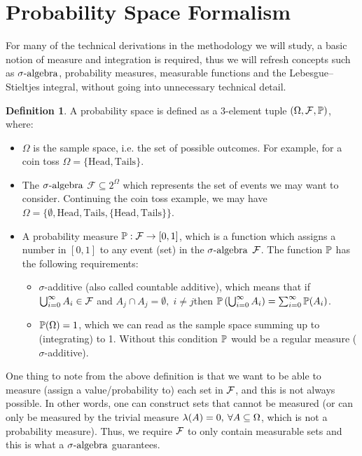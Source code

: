 \documentclass[a4paper,12pt,twoside,openright]{report}
\theoremstyle{definition}
\newtheorem{definition}{Definition}[section]
\begin{document}
\section{Probability Space Formalism}

For many of the technical derivations in the methodology we will study, a basic notion of measure and integration is required, thus we will refresh concepts such as $\sigalg$, probability measures,  measurable functions and the Lebesgue–Stieltjes integral, without going into unnecessary technical detail.

\begin{definition} \label{def:prob_space}
A probability space is defined as a 3-element tuple $\probspace$, where:
\begin{itemize}
    \item $\Omega$ is the sample space, i.e. the set of possible outcomes. For example, for a coin toss $\Omega=\{\text{Head}, \text{Tails}\}$. 
    \item The $\sigalg$ $\mathcal{F} \subseteq 2^{\Omega}$ which represents the set of events we may want to consider. Continuing the coin toss example, we may have $\Omega=\{\emptyset, \text{Head}, \text{Tails},\{\text{Head}, \text{Tails}\}\}$.
    \item A probability measure $\P:\calF \rightarrow [0,1]$, which is a function which assigns a number in $[0,1]$ to any event (set) in the $\sigalg$ $\calF$. The function $\P$ has the following requirements:
    \begin{itemize}
        \item $\sigma$-additive (also called countable additive), which means that if  $\bigcup_{i=0}^\infty  A_i\in \calF$ and $A_j \cap A_j = \emptyset, \; i \neq j$then $\P\left(\bigcup_{i=0}^\infty A_i\right) =\sum_{i=0}^\infty \P(A_i) $.
        \item $\P(\Omega)=1$, which we can read as the sample space summing up to (integrating) to 1.  Without this condition $\P$ would be a regular measure ($\sigma$-additive).
    \end{itemize}
\end{itemize}
\end{definition}
One thing to note from the above definition is that we want to be able to measure (assign a value/probability to) each set in $\calF$, and this is not always possible. In other words, one can construct sets that cannot be measured (or can only be measured by the trivial measure $\callambda(A) = 0,\:\forall A \subseteq \Omega$, which is not a probability measure). Thus, we require $\calF$ to only contain measurable sets and this is what a $\sigalg$ guarantees.
\end{document}
